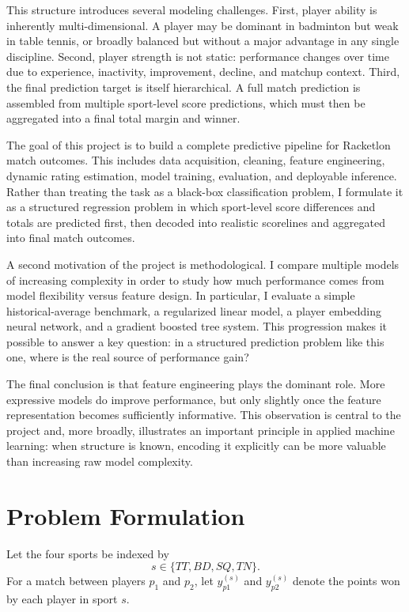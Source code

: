 \documentclass[10pt,twocolumn]{article}
\begin{document}
This structure introduces several modeling challenges. First, player ability is inherently multi-dimensional. A player may be dominant in badminton but weak in table tennis, or broadly balanced but without a major advantage in any single discipline. Second, player strength is not static: performance changes over time due to experience, inactivity, improvement, decline, and matchup context. Third, the final prediction target is itself hierarchical. A full match prediction is assembled from multiple sport-level score predictions, which must then be aggregated into a final total margin and winner.

The goal of this project is to build a complete predictive pipeline for Racketlon match outcomes. This includes data acquisition, cleaning, feature engineering, dynamic rating estimation, model training, evaluation, and deployable inference. Rather than treating the task as a black-box classification problem, I formulate it as a structured regression problem in which sport-level score differences and totals are predicted first, then decoded into realistic scorelines and aggregated into final match outcomes.

A second motivation of the project is methodological. I compare multiple models of increasing complexity in order to study how much performance comes from model flexibility versus feature design. In particular, I evaluate a simple historical-average benchmark, a regularized linear model, a player embedding neural network, and a gradient boosted tree system. This progression makes it possible to answer a key question: in a structured prediction problem like this one, where is the real source of performance gain?

The final conclusion is that feature engineering plays the dominant role. More expressive models do improve performance, but only slightly once the feature representation becomes sufficiently informative. This observation is central to the project and, more broadly, illustrates an important principle in applied machine learning: when structure is known, encoding it explicitly can be more valuable than increasing raw model complexity.

\section{Problem Formulation}

Let the four sports be indexed by
\[
    s \in \{TT, BD, SQ, TN\}.
\]
For a match between players $p_1$ and $p_2$, let $y^{(s)}_{p1}$ and $y^{(s)}_{p2}$ denote the points won by each player in sport $s$.
\end{document}
